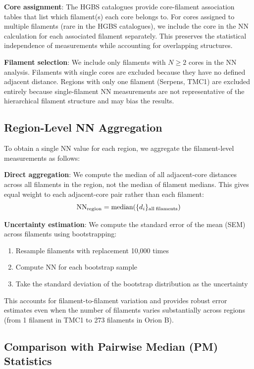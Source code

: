 \documentclass[twoside,twocolumn]{mnras}
\begin{document}
\textbf{Core assignment}: The HGBS catalogues provide core-filament association tables that list which filament(s) each core belongs to. For cores assigned to multiple filaments (rare in the HGBS catalogues), we include the core in the NN calculation for each associated filament separately. This preserves the statistical independence of measurements while accounting for overlapping structures.

\textbf{Filament selection}: We include only filaments with $N \geq 2$ cores in the NN analysis. Filaments with single cores are excluded because they have no defined adjacent distance. Regions with only one filament (Serpens, TMC1) are excluded entirely because single-filament NN measurements are not representative of the hierarchical filament structure and may bias the results.

\subsection{Region-Level NN Aggregation}

To obtain a single NN value for each region, we aggregate the filament-level measurements as follows:

\textbf{Direct aggregation}: We compute the median of all adjacent-core distances across all filaments in the region, not the median of filament medians. This gives equal weight to each adjacent-core pair rather than each filament:
\begin{equation}
    {\rm NN}_{\rm region} = {\rm median}(\{d_i\}_{\rm all\;filaments})
\end{equation}

\textbf{Uncertainty estimation}: We compute the standard error of the mean (SEM) across filaments using bootstrapping:
\begin{enumerate}
    \item Resample filaments with replacement 10,000 times
    \item Compute NN for each bootstrap sample
    \item Take the standard deviation of the bootstrap distribution as the uncertainty
\end{enumerate}

This accounts for filament-to-filament variation and provides robust error estimates even when the number of filaments varies substantially across regions (from 1 filament in TMC1 to 273 filaments in Orion B).

\subsection{Comparison with Pairwise Median (PM) Statistics}
\end{document}
